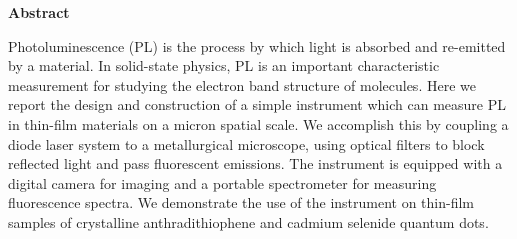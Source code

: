 \thispagestyle{plain}
\begin{center}
 
 
    \textbf{Abstract}
\end{center}

Photoluminescence (PL) is the process by which light is absorbed and re-emitted by a material. In solid-state physics, PL is an important characteristic measurement for studying the electron band structure of molecules. Here we report the design and construction of a simple instrument which can measure PL in thin-film materials on a micron spatial scale. We accomplish this by coupling a diode laser system to a metallurgical microscope, using optical filters to block reflected light and pass fluorescent emissions. The instrument is equipped with a digital camera for imaging and a portable spectrometer for measuring fluorescence spectra. We demonstrate the use of the instrument on thin-film samples of crystalline anthradithiophene and cadmium selenide quantum dots.

